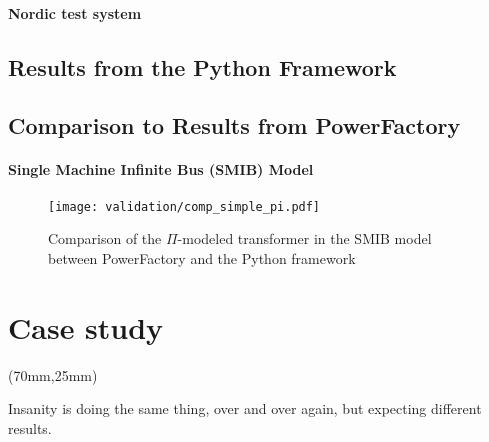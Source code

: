 \subsubsection{Nordic test system}

\section{Results from the Python Framework}

\section{Comparison to Results from PowerFactory}

\subsubsection{Single Machine Infinite Bus (SMIB) Model}

\begin{figure}[htb]
    \centering
    \texttt{[image: validation/comp\_simple\_pi.pdf]}
    \caption{Comparison of the $\Pi$-modeled transformer in the \acs{SMIB} model between PowerFactory and the Python framework}
    \label{fig:comp-simple-pi}
\end{figure}


\chapter{Case study}
\label{chap:case-study}

\begin{textblock*}{.7\textwidth}(70mm,25mm)
    \begin{fquote}
        Insanity is doing the same thing, over and over again, but expecting different results.
    \end{fquote}
\end{textblock*}


